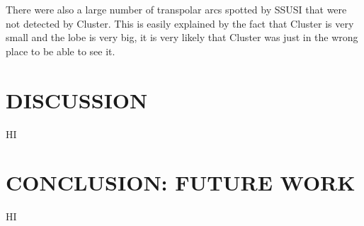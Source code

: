 \documentclass[12pt]{article}
\begin{document}
There were also a large number of transpolar arcs spotted by SSUSI that were not detected by Cluster. This is easily explained by the fact that Cluster is very small and the lobe is very big, it is very likely that Cluster was just in the wrong place to be able to see it.
\section{DISCUSSION}
HI

\section{CONCLUSION: FUTURE WORK}
HI \\

\printbibliography
\end{document}
